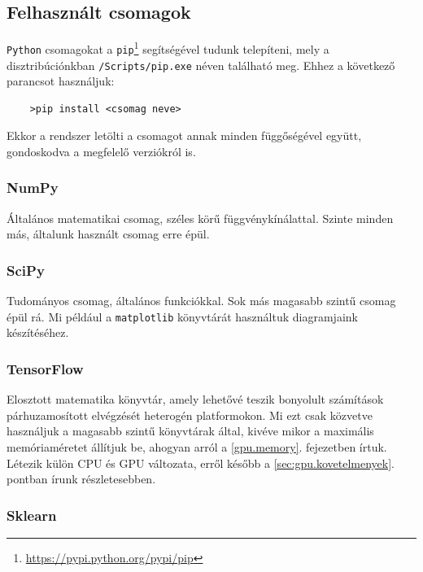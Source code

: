\subsection{Felhasznált csomagok}

\texttt{Python} csomagokat a \texttt{pip}\footnote{\url{https://pypi.python.org/pypi/pip}} segítségével tudunk telepíteni, mely a 
disztribúciónkban \texttt{/Scripts/pip.exe} néven található meg. Ehhez a következő parancsot
használjuk:

\begin{lstlisting}  
	>pip install <csomag neve>
\end{lstlisting}

Ekkor a rendszer letölti a csomagot annak minden függőségével együtt, gondoskodva a megfelelő
verziókról is. 

\subsubsection{NumPy}

Általános matematikai csomag, széles körű függvénykínálattal.
Szinte minden más, általunk használt csomag erre épül.


\subsubsection{SciPy}

Tudományos csomag, általános funkciókkal. Sok más magasabb szintű csomag épül rá. Mi például
a \texttt{matplotlib} könyvtárát használtuk diagramjaink készítéséhez.


\subsubsection{TensorFlow}

Elosztott matematika könyvtár, amely lehetővé teszik bonyolult számítások párhuzamosított
elvégzését heterogén platformokon. Mi ezt csak közvetve használjuk a magasabb szintű 
könyvtárak által, kivéve mikor a maximális memóriaméretet állítjuk be, ahogyan arról a 
\ref{gpu.memory}. fejezetben írtuk. Létezik külön CPU és GPU változata, erről később a 
\ref{sec:gpu.kovetelmenyek}. pontban írunk részletesebben.



\subsubsection{Sklearn} 

